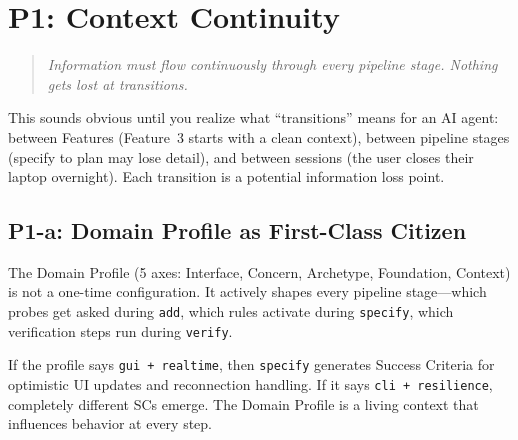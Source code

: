 \documentclass[11pt,a4paper,openright,twoside]{report}
\begin{document}
\section{P1: Context Continuity}

\begin{quote}
\emph{Information must flow continuously through every pipeline stage. Nothing gets lost at transitions.}
\end{quote}

This sounds obvious until you realize what ``transitions'' means for an AI agent: between Features (Feature~3 starts with a clean context), between pipeline stages (specify to plan may lose detail), and between sessions (the user closes their laptop overnight). Each transition is a potential information loss point.

\subsection{P1-a: Domain Profile as First-Class Citizen}

The Domain Profile (5 axes: Interface, Concern, Archetype, Foundation, Context) is not a one-time configuration. It actively shapes every pipeline stage---which probes get asked during \texttt{add}, which rules activate during \texttt{specify}, which verification steps run during \texttt{verify}.

If the profile says \texttt{gui + realtime}, then \texttt{specify} generates Success Criteria for optimistic UI updates and reconnection handling. If it says \texttt{cli + resilience}, completely different SCs emerge. The Domain Profile is a living context that influences behavior at every step.
\end{document}
